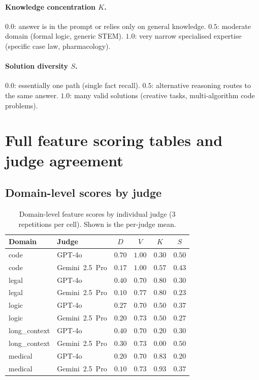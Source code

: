 \documentclass{article}
\begin{document}
\paragraph{Knowledge concentration $K$.} $0.0$: answer is in the prompt or
relies only on general knowledge. $0.5$: moderate domain (formal logic, generic
STEM). $1.0$: very narrow specialised expertise (specific case law,
pharmacology).

\paragraph{Solution diversity $S$.} $0.0$: essentially one path (single fact
recall). $0.5$: alternative reasoning routes to the same answer.
$1.0$: many valid solutions (creative tasks, multi-algorithm code problems).


\section{Full feature scoring tables and judge agreement}
\label{app:full-features}

\subsection{Domain-level scores by judge}

\begin{table}[h]
\centering
\caption{Domain-level feature scores by individual judge ($3$ repetitions per cell). Shown is the per-judge mean.}
\label{tab:perjudge}
\begin{tabular}{ll cccc}
\toprule
\textbf{Domain} & \textbf{Judge} & $D$ & $V$ & $K$ & $S$ \\
\midrule
code         & GPT-4o            & $0.70$ & $1.00$ & $0.30$ & $0.50$ \\
code         & Gemini~2.5~Pro    & $0.17$ & $1.00$ & $0.57$ & $0.43$ \\
legal        & GPT-4o            & $0.40$ & $0.70$ & $0.80$ & $0.30$ \\
legal        & Gemini~2.5~Pro    & $0.10$ & $0.77$ & $0.80$ & $0.23$ \\
logic        & GPT-4o            & $0.27$ & $0.70$ & $0.50$ & $0.37$ \\
logic        & Gemini~2.5~Pro    & $0.20$ & $0.73$ & $0.50$ & $0.27$ \\
long\_context & GPT-4o           & $0.40$ & $0.70$ & $0.20$ & $0.30$ \\
long\_context & Gemini~2.5~Pro   & $0.30$ & $0.73$ & $0.00$ & $0.50$ \\
medical      & GPT-4o            & $0.20$ & $0.70$ & $0.83$ & $0.20$ \\
medical      & Gemini~2.5~Pro    & $0.10$ & $0.73$ & $0.93$ & $0.37$ \\
\bottomrule
\end{tabular}
\end{table}
\end{document}
